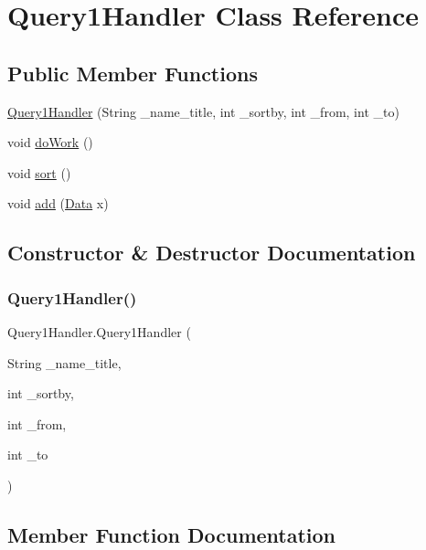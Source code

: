 \hypertarget{class_query1_handler}{}\section{Query1\+Handler Class Reference}
\label{class_query1_handler}
\subsection*{Public Member Functions}
\begin{DoxyCompactItemize}
\item 
\hyperlink{class_query1_handler_ac5a192b72a52acf6999cbfd635bc4362}{Query1\+Handler} (String \+\_\+name\+\_\+title, int \+\_\+sortby, int \+\_\+from, int \+\_\+to)
\item 
void \hyperlink{class_query1_handler_ab3667be62a56c75f35e951d609b9a253}{do\+Work} ()
\item 
void \hyperlink{class_query1_handler_a4e48d3e6ee1d7f644eeb165c980ac1b6}{sort} ()
\item 
void \hyperlink{class_query1_handler_a217ca3f99ec7cc755592185c5a639be1}{add} (\hyperlink{class_data}{Data} x)
\end{DoxyCompactItemize}


\subsection{Constructor \& Destructor Documentation}
\hypertarget{class_query1_handler_ac5a192b72a52acf6999cbfd635bc4362}{}\label{class_query1_handler_ac5a192b72a52acf6999cbfd635bc4362} 
\subsubsection{\texorpdfstring{Query1\+Handler()}{Query1Handler()}}
{\footnotesize\ttfamily Query1\+Handler.\+Query1\+Handler (\begin{DoxyParamCaption}\item[{String}]{\+\_\+name\+\_\+title,  }\item[{int}]{\+\_\+sortby,  }\item[{int}]{\+\_\+from,  }\item[{int}]{\+\_\+to }\end{DoxyParamCaption})}



\subsection{Member Function Documentation}
\hypertarget{class_query1_handler_a217ca3f99ec7cc755592185c5a639be1}{}\label{class_query1_handler_a217ca3f99ec7cc755592185c5a639be1} 

